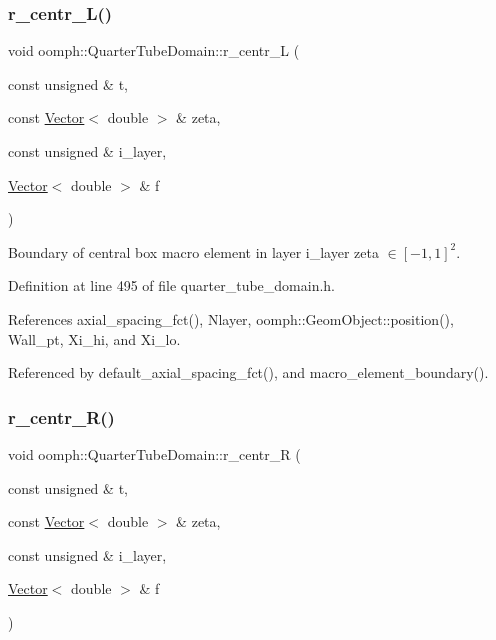 \subsubsection{\texorpdfstring{r\+\_\+centr\+\_\+\+L()}{r\_centr\_L()}}
{\footnotesize\ttfamily void oomph\+::\+Quarter\+Tube\+Domain\+::r\+\_\+centr\+\_\+L (\begin{DoxyParamCaption}\item[{const unsigned \&}]{t,  }\item[{const \hyperlink{classoomph_1_1Vector}{Vector}$<$ double $>$ \&}]{zeta,  }\item[{const unsigned \&}]{i\+\_\+layer,  }\item[{\hyperlink{classoomph_1_1Vector}{Vector}$<$ double $>$ \&}]{f }\end{DoxyParamCaption})\hspace{0.3cm}{\ttfamily [private]}}



Boundary of central box macro element in layer i\+\_\+layer zeta $ \in [-1,1]^2 $. 



Definition at line 495 of file quarter\+\_\+tube\+\_\+domain.\+h.



References axial\+\_\+spacing\+\_\+fct(), Nlayer, oomph\+::\+Geom\+Object\+::position(), Wall\+\_\+pt, Xi\+\_\+hi, and Xi\+\_\+lo.



Referenced by default\+\_\+axial\+\_\+spacing\+\_\+fct(), and macro\+\_\+element\+\_\+boundary().

\mbox{\label{classoomph_1_1QuarterTubeDomain_ae7312c0c8754d36a69e475cbf97e479e}} 
\subsubsection{\texorpdfstring{r\+\_\+centr\+\_\+\+R()}{r\_centr\_R()}}
{\footnotesize\ttfamily void oomph\+::\+Quarter\+Tube\+Domain\+::r\+\_\+centr\+\_\+R (\begin{DoxyParamCaption}\item[{const unsigned \&}]{t,  }\item[{const \hyperlink{classoomph_1_1Vector}{Vector}$<$ double $>$ \&}]{zeta,  }\item[{const unsigned \&}]{i\+\_\+layer,  }\item[{\hyperlink{classoomph_1_1Vector}{Vector}$<$ double $>$ \&}]{f }\end{DoxyParamCaption})\hspace{0.3cm}{\ttfamily [private]}}



